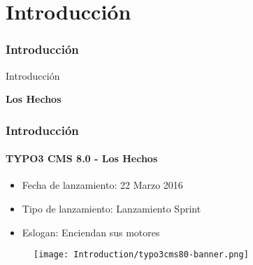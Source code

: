 %

\section{Introducción}
\begin{frame}[fragile]
	\frametitle{Introducción}

	\begin{center}\huge{Introducción}\end{center}
	\begin{center}\huge{\color{typo3darkgrey}\textbf{Los Hechos}}\end{center}

\end{frame}

\begin{frame}[fragile]
	\frametitle{Introducción}
	\framesubtitle{TYPO3 CMS 8.0 - Los Hechos}

	\begin{itemize}
		\item Fecha de lanzamiento: 22 Marzo 2016
		\item Tipo de lanzamiento: Lanzamiento Sprint
		\item Eslogan: Enciendan sus motores
	\end{itemize}

	\begin{figure}
		\texttt{[image: Introduction/typo3cms80-banner.png]}
	\end{figure}

\end{frame}

